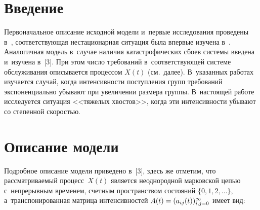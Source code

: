 
\vspace*{18pt}



\thispagestyle{headings}

\begin{multicols}{2}

\label{st\stat}


\section{Введение}

Первоначальное описание исходной модели и~первые исследования проведены в~\cite{marin2020}, 
соответствующая нестационарная ситуация была впервые изуче\-на в~\cite{zrsk2020}. 
Аналогичная  модель в~случае наличия катастрофических сбоев системы введена и~изуче\-на 
в~[3]. При этом число требований в~соответствующей системе обслуживания
 описывается процессом $X(t)$ (см.\ далее).
В~указанных работах изуча\-ет\-ся случай, когда интенсивности поступления групп 
требований экспоненциально убывают при увеличении размера группы.
В~настоящей работе исследуется ситуация <<тяжелых хвостов>>,  
когда эти интенсивности убывают со степенной ско\-ростью.
{

}

\section{Описание модели}

Подробное описание модели приведено в~[3], здесь же отметим, что 
рассматриваемый процесс~$X(t)$ является неоднородной марковской \mbox{цепью} с~непрерывным временем, 
счетным пространством состояний $\{ 0, 1, 2, \dots\}$, а~транспонированная матрица 
интенсивностей  $A(t)\hm=(a_{ij}(t))_{i,j=0}^{\infty}$  имеет вид:



\end{multicols}
